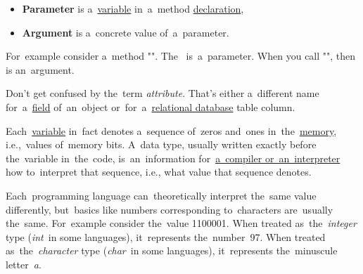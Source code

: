 \label{parameterargument}
\begin{itemize}
    \item \textbf{Parameter} is a~\hyperref[variablefieldproperty]{variable} in~a~method \hyperref[declarationdefinition]{declaration},
    \item \textbf{Argument} is a~concrete value of~a~parameter.
\end{itemize}
For~example consider a~method "". The~ is~a~parameter. When you call "", then  is an~argument.

\warning Don't get confused by the~term \textit{attribute}. That's either a~different name for~a~\hyperref[variablefieldproperty]{field} of~an~object or~for~a~\hyperref[relationaldatabase]{relational database} table column.

\label{datatypes}
Each~\hyperref[variablefieldproperty]{variable} in~fact denotes a~sequence of~zeros and~ones in~the~\hyperref[systemmemory]{memory}, i.e.,~values of~memory bits. A~data type, usually written exactly before the~variable in~the~code, is~an~information for~\hyperref[compiledinterpretedlanguages]{a~compiler or~an~interpreter} how to~interpret that sequence, i.e., what value that sequence denotes.

Each~programming language can~theoretically interpret the~same value differently, but~basics like numbers corresponding to~characters are~usually the~same. For~example consider the~value 1100001. When treated as~the~\textit{integer} type (\textit{int}~in some languages), it~represents the~number~97. When treated as~the~\textit{character} type (\textit{char}~in some languages), it~represents the~minuscule letter~\textit{a}.

